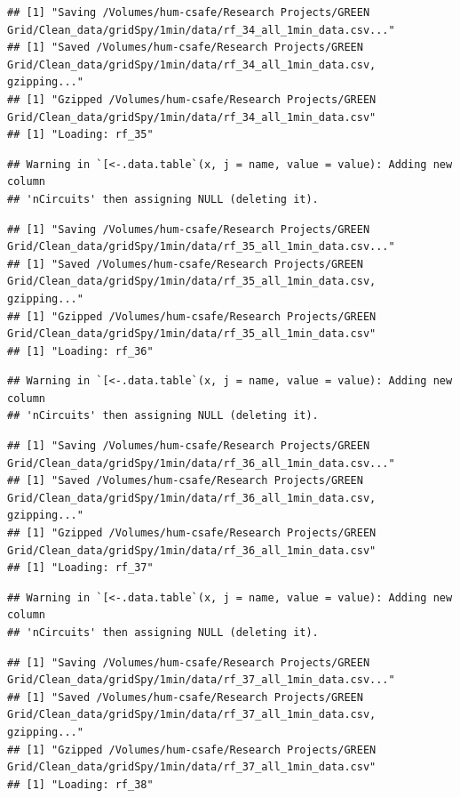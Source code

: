 \documentclass[]{article}
\begin{document}
\begin{verbatim}
## [1] "Saving /Volumes/hum-csafe/Research Projects/GREEN Grid/Clean_data/gridSpy/1min/data/rf_34_all_1min_data.csv..."
## [1] "Saved /Volumes/hum-csafe/Research Projects/GREEN Grid/Clean_data/gridSpy/1min/data/rf_34_all_1min_data.csv, gzipping..."
## [1] "Gzipped /Volumes/hum-csafe/Research Projects/GREEN Grid/Clean_data/gridSpy/1min/data/rf_34_all_1min_data.csv"
## [1] "Loading: rf_35"
\end{verbatim}

\begin{verbatim}
## Warning in `[<-.data.table`(x, j = name, value = value): Adding new column
## 'nCircuits' then assigning NULL (deleting it).
\end{verbatim}

\begin{verbatim}
## [1] "Saving /Volumes/hum-csafe/Research Projects/GREEN Grid/Clean_data/gridSpy/1min/data/rf_35_all_1min_data.csv..."
## [1] "Saved /Volumes/hum-csafe/Research Projects/GREEN Grid/Clean_data/gridSpy/1min/data/rf_35_all_1min_data.csv, gzipping..."
## [1] "Gzipped /Volumes/hum-csafe/Research Projects/GREEN Grid/Clean_data/gridSpy/1min/data/rf_35_all_1min_data.csv"
## [1] "Loading: rf_36"
\end{verbatim}

\begin{verbatim}
## Warning in `[<-.data.table`(x, j = name, value = value): Adding new column
## 'nCircuits' then assigning NULL (deleting it).
\end{verbatim}

\begin{verbatim}
## [1] "Saving /Volumes/hum-csafe/Research Projects/GREEN Grid/Clean_data/gridSpy/1min/data/rf_36_all_1min_data.csv..."
## [1] "Saved /Volumes/hum-csafe/Research Projects/GREEN Grid/Clean_data/gridSpy/1min/data/rf_36_all_1min_data.csv, gzipping..."
## [1] "Gzipped /Volumes/hum-csafe/Research Projects/GREEN Grid/Clean_data/gridSpy/1min/data/rf_36_all_1min_data.csv"
## [1] "Loading: rf_37"
\end{verbatim}

\begin{verbatim}
## Warning in `[<-.data.table`(x, j = name, value = value): Adding new column
## 'nCircuits' then assigning NULL (deleting it).
\end{verbatim}

\begin{verbatim}
## [1] "Saving /Volumes/hum-csafe/Research Projects/GREEN Grid/Clean_data/gridSpy/1min/data/rf_37_all_1min_data.csv..."
## [1] "Saved /Volumes/hum-csafe/Research Projects/GREEN Grid/Clean_data/gridSpy/1min/data/rf_37_all_1min_data.csv, gzipping..."
## [1] "Gzipped /Volumes/hum-csafe/Research Projects/GREEN Grid/Clean_data/gridSpy/1min/data/rf_37_all_1min_data.csv"
## [1] "Loading: rf_38"
\end{verbatim}
\end{document}
